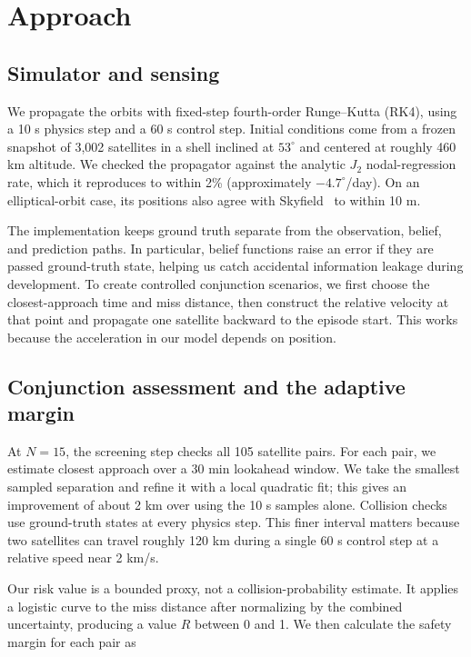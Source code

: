 \documentclass[conference]{IEEEtran}
\begin{document}
\section{Approach}
\label{sec:approach}

\subsection{Simulator and sensing}

We propagate the orbits with fixed-step fourth-order Runge--Kutta (RK4), using a 10 s physics step and a 60 s control step. Initial conditions come from a frozen snapshot of 3,002 satellites in a shell inclined at $53^\circ$ and centered at roughly 460 km altitude. We checked the propagator against the analytic $J_2$ nodal-regression rate, which it reproduces to within 2\% (approximately $-4.7^\circ$/day). On an elliptical-orbit case, its positions also agree with Skyfield~\cite{rhodes2019} to within 10 m.

The implementation keeps ground truth separate from the observation, belief, and prediction paths. In particular, belief functions raise an error if they are passed ground-truth state, helping us catch accidental information leakage during development. To create controlled conjunction scenarios, we first choose the closest-approach time and miss distance, then construct the relative velocity at that point and propagate one satellite backward to the episode start. This works because the acceleration in our model depends on position.

\subsection{Conjunction assessment and the adaptive margin}

At $N=15$, the screening step checks all 105 satellite pairs. For each pair, we estimate closest approach over a 30 min lookahead window. We take the smallest sampled separation and refine it with a local quadratic fit; this gives an improvement of about 2 km over using the 10 s samples alone. Collision checks use ground-truth states at every physics step. This finer interval matters because two satellites can travel roughly 120 km during a single 60 s control step at a relative speed near 2 km/s.

Our risk value is a bounded proxy, not a collision-probability estimate. It applies a logistic curve to the miss distance after normalizing by the combined uncertainty, producing a value $R$ between 0 and 1. We then calculate the safety margin for each pair as
\end{document}
